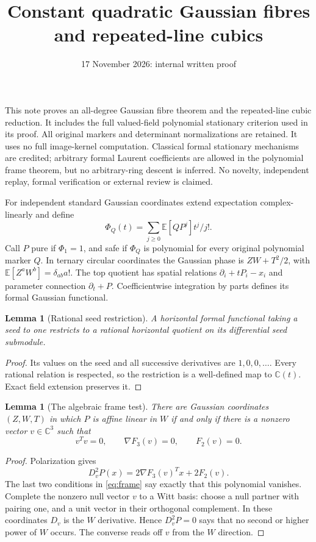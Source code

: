 \documentclass[11pt]{article}
\title{Constant quadratic Gaussian fibres and repeated-line cubics}
\author{}\date{17 November 2026: internal written proof}
\newtheorem{lemma}[theorem]{Lemma}
\theoremstyle{definition}\newtheorem{definition}[theorem]{Definition}
\theoremstyle{remark}\newtheorem{remark}[theorem]{Remark}
\newcommand{\C}{\mathbb C}
\begin{document}
\maketitle
This note proves an all-degree Gaussian fibre theorem and the repeated-line
cubic reduction. It includes the full valued-field polynomial stationary
criterion used in its proof. All original markers and determinant
normalizations are retained. It uses no full image-kernel computation.
Classical formal stationary mechanisms are credited; arbitrary formal
Laurent coefficients are allowed in the polynomial frame theorem, but
no arbitrary-ring descent is inferred. No novelty, independent replay,
formal verification or external review is claimed.

For independent standard Gaussian coordinates extend expectation
complex-linearly and define
\[ \Phi_Q(t)=\sum_{j\ge0}\mathbb E[QP^j]t^j/j!. \]
Call $P$ pure if $\Phi_1=1$, and safe if $\Phi_Q$ is polynomial
for every original polynomial marker $Q$. In ternary circular
coordinates the Gaussian phase is $ZW+T^2/2$, with
$\mathbb E[Z^aW^b]=\delta_{ab}a!$.
The top quotient has spatial relations $\partial_i+tP_i-x_i$ and
parameter connection $\partial_t+P$. Coefficientwise integration by
parts defines its formal Gaussian functional.
\begin{lemma}[Rational seed restriction]\label{lem:seedfunctional}
A horizontal formal functional taking a seed to one restricts to a
rational horizontal quotient on its differential seed submodule.
\end{lemma}
\begin{proof}
Its values on the seed and all successive derivatives are $1,0,0,\ldots$.
Every rational relation is respected, so the restriction is a well-defined
map to $\mathbb C(t)$. Exact field extension preserves it.
\end{proof}
\begin{lemma}[The algebraic frame test]\label{lem:frame}
There are Gaussian coordinates $(Z,W,T)$ in which $P$ is affine linear
in $W$ if and only if there is a nonzero vector $v\in\C^3$ such that
\begin{equation}\label{eq:frame}
 v^Tv=0,\qquad \nabla F_3(v)=0,\qquad F_2(v)=0.
\end{equation}
\end{lemma}
\begin{proof}
Polarization gives
\[
 D_v^2P(x)=2\nabla F_3(v)^Tx+2F_2(v).
\]
The last two conditions in \eqref{eq:frame} say exactly that this
polynomial vanishes. Complete the nonzero null vector $v$ to a Witt
basis: choose a null partner with pairing one, and a unit vector in
their orthogonal complement. In these coordinates $D_v$ is the $W$
derivative. Hence $D_v^2P=0$ says that no second or higher power of
$W$ occurs. The converse reads off $v$ from the $W$ direction.
\end{proof}
\end{document}
